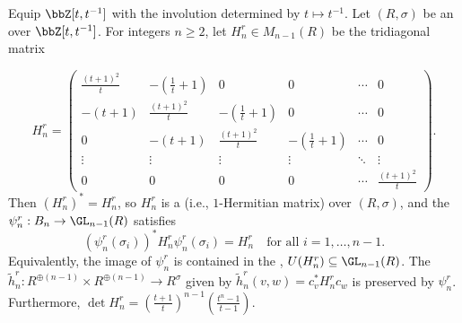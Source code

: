 \begin{proposition} \label{proposition:hermitian_form_preserved_by_reduced_burau_representation}
    Equip $\bbZ[t,t^{-1}]$ with the involution determined by $t \mapsto t^{-1}$. Let $(R,\sigma)$ be an  over $\bbZ[t,t^{-1}]$. For integers $n \geq 2$, let $H_n^r \in M_{n-1}(R)$ be the tridiagonal matrix

    $$H_n^r = \begin{pmatrix}
        \frac{(t+1)^2}{t} & -(\frac{1}{t}+1) & 0 & 0 & \cdots & 0 \\
        -(t + 1) & \frac{(t+1)^2}{t} & -(\frac{1}{t} + 1) & 0 & \cdots & 0 \\
        0 & -(t+1) & \frac{(t+1)^2}{t} & -(\frac{1}{t} + 1) & \cdots & 0 \\
        \vdots & \vdots & \vdots & \vdots & \ddots & \vdots \\
        0 & 0 & 0 & 0 & \cdots & \frac{(t+1)^2}{t}
    \end{pmatrix}.$$
    Then $(H_n^r)^* = H_n^r$, so $H_n^r$ is a  (i.e., $1$-Hermitian matrix) over $(R,\sigma)$, and the  $\psi_n^r: B_n \to \GL_{n-1}(R)$ satisfies
    $$(\psi_n^r(\sigma_i))^* H_n^r \psi_n^r(\sigma_i) = H_n^r \quad \text{for all } i = 1,\ldots,n-1.$$
    Equivalently, the image of $\psi_n^r$ is contained in the , $U(H_n^r) \subseteq \GL_{n-1}(R)$. The  $\tilde{h}_n^r: R^{\oplus(n-1)} \times R^{\oplus(n-1)} \to R^{\sigma}$ given by $\tilde{h}_n^r(v,w) = c_v^* H_n^r c_w$ is preserved by $\psi_n^r$. Furthermore, $\det H_n^r = \left( \frac{t+1}{t} \right)^{n-1} \left( \frac{t^{n} - 1}{t-1} \right)$.
\end{proposition}
